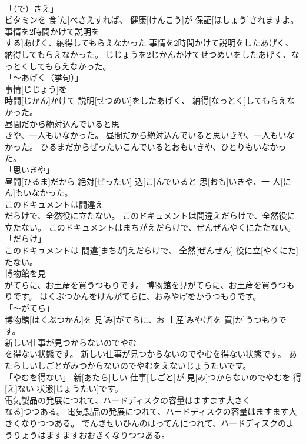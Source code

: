 \documentclass[8pt]{extreport}
\begin{document}
\begin{CJK}{UTF8}{min}
\\	「（で）さえ」 
\\	ビタミンを 食[た]べさえすれば、 健康[けんこう]が 保証[ほしょう]されますよ。		
\\	事情を2時間かけて説明を
\\	する]あげく、納得してもらえなかった	事情を2時間かけて説明をしたあげく、納得してもらえなかった。	じじょうを2じかんかけてせつめいをしたあげく、なっとくしてもらえなかった。	
\\	「～あげく（挙句）」 
\\	事情[じじょう]を 
\\	時間[じかん]かけて 説明[せつめい]をしたあげく、 納得[なっとく]してもらえなかった。		
\\	昼間だから絶対込んでいると思
\\	きや、一人もいなかった。	昼間だから絶対込んでいると思いきや、一人もいなかった。	ひるまだからぜったいこんでいるとおもいきや、ひとりもいなかった。	
\\	「思いきや」 
\\	昼間[ひるま]だから 絶対[ぜったい] 込[こ]んでいると 思[おも]いきや、一 人[にん]もいなかった。		
\\	このドキュメントは間違え
\\	だらけで、全然役に立たない。	このドキュメントは間違えだらけで、全然役に立たない。	このドキュメントはまちがえだらけで、ぜんぜんやくにたたない。	
\\	「だらけ」 
\\	このドキュメントは 間違[まちが]えだらけで、 全然[ぜんぜん] 役に立[やくにた]たない。		
\\	博物館を見
\\	がてらに、お土産を買うつもりです。	博物館を見がてらに、お土産を買うつもりです。	はくぶつかんをけんがてらに、おみやげをかうつもりです。	
\\	「～がてら」 
\\	博物館[はくぶつかん]を 見[み]がてらに、お 土産[みやげ]を 買[か]うつもりです。		
\\	新しい仕事が見つからないのでやむ
\\	を得ない状態です。	新しい仕事が見つからないのでやむを得ない状態です。	あたらしいしごとがみつからないのでやむをえないじょうたいです。	
\\	「やむを得ない」	新[あたら]しい 仕事[しごと]が 見[み]つからないのでやむを 得[え]ない 状態[じょうたい]です。		
\\	電気製品の発展につれて、ハードディスクの容量はますます大きく
\\	なる]つつある。	電気製品の発展につれて、ハードディスクの容量はますます大きくなりつつある。	でんきせいひんのはってんにつれて、ハードディスクのようりょうはますますおおきくなりつつある。	

\end{CJK}
\end{document}
